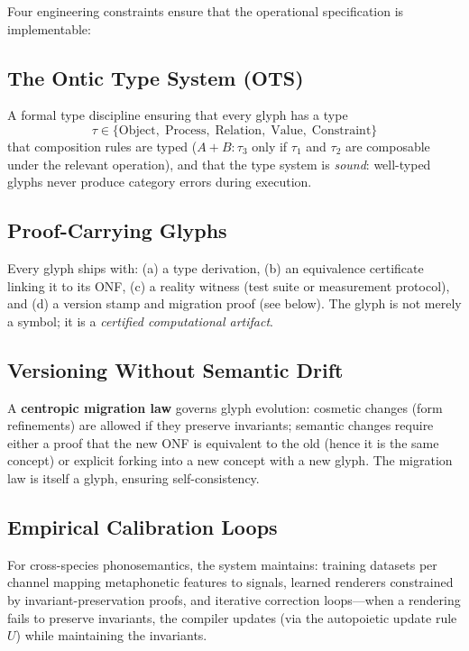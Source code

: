 \documentclass[12pt, letterpaper]{book}
\def\oplus{+}%
\begin{document}
Four engineering constraints ensure that the operational specification is implementable:

\subsection{The Ontic Type System (OTS)}

A formal type discipline ensuring that every glyph has a type
\[
\tau \in \{\mathrm{Object},\; \mathrm{Process},\; \mathrm{Relation},\; \mathrm{Value},\; \mathrm{Constraint}\}
\]
that composition rules are typed ($A \oplus B : \tau_3$ only if $\tau_1$ and $\tau_2$ are composable under the relevant operation), and that the type system is \textit{sound}: well-typed glyphs never produce category errors during execution.

\subsection{Proof-Carrying Glyphs}

Every glyph ships with: (a) a type derivation, (b) an equivalence certificate linking it to its ONF, (c) a reality witness (test suite or measurement protocol), and (d) a version stamp and migration proof (see below). The glyph is not merely a symbol; it is a \textit{certified computational artifact}.

\subsection{Versioning Without Semantic Drift}

A \textbf{centropic migration law} governs glyph evolution: cosmetic changes (form refinements) are allowed if they preserve invariants; semantic changes require either a proof that the new ONF is equivalent to the old (hence it is the same concept) or explicit forking into a new concept with a new glyph. The migration law is itself a glyph, ensuring self-consistency.

\subsection{Empirical Calibration Loops}

For cross-species phonosemantics, the system maintains: training datasets per channel mapping metaphonetic features to signals, learned renderers constrained by invariant-preservation proofs, and iterative correction loops---when a rendering fails to preserve invariants, the compiler updates (via the autopoietic update rule $U$) while maintaining the invariants.
\end{document}
